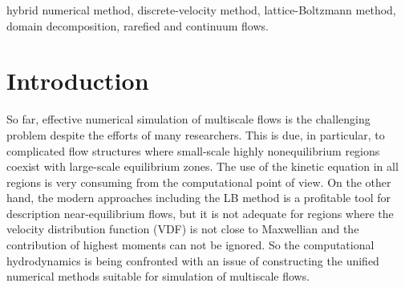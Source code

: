 \documentclass[]{elsarticle} %
\begin{document}
\begin{frontmatter}
\begin{abstract}
\end{abstract}

\begin{keyword}
hybrid numerical method,
discrete-velocity method,
lattice-Boltzmann method,
domain decomposition,
rarefied and continuum flows.
\end{keyword}

\end{frontmatter}


\section{Introduction}\label{sec:intro}

So far, effective numerical simulation of multiscale flows is the challenging problem despite the efforts of many researchers.
This is due, in particular, to complicated flow structures where small-scale highly nonequilibrium regions
coexist with large-scale equilibrium zones.
The use of the kinetic equation in all regions is very consuming from the computational point of view.
On the other hand, the modern approaches including the LB method is a profitable tool for description near-equilibrium flows,
but it is not adequate for regions where the velocity distribution function (VDF) is not close to Maxwellian
and the contribution of highest moments can not be ignored.
So the computational hydrodynamics is being confronted with an issue of constructing the unified numerical methods
suitable for simulation of multiscale flows.
\end{document}
